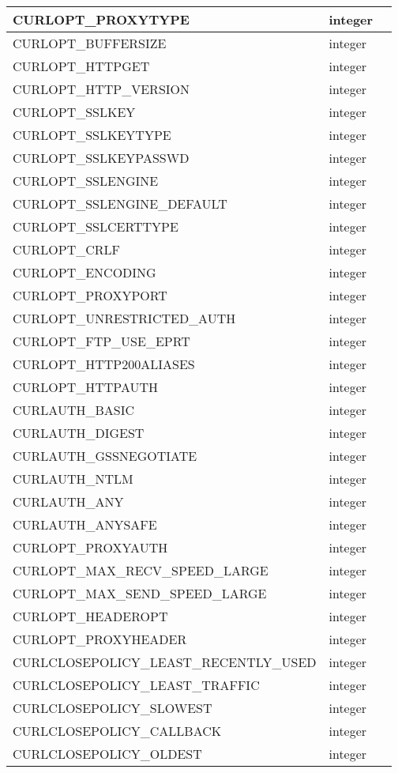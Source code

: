 \begin{longtable}{|m{150pt}|m{40pt}|m{200pt}|}
\hline
CURLOPT\_PROXYTYPE&integer&\\
\hline
CURLOPT\_BUFFERSIZE&integer&\\
\hline
CURLOPT\_HTTPGET&integer&\\
\hline
CURLOPT\_HTTP\_VERSION&integer&\\
\hline
CURLOPT\_SSLKEY&integer&\\
\hline
CURLOPT\_SSLKEYTYPE&integer&\\
\hline
CURLOPT\_SSLKEYPASSWD&integer&\\
\hline
CURLOPT\_SSLENGINE&integer&\\
\hline
CURLOPT\_SSLENGINE\_DEFAULT&integer&\\
\hline
CURLOPT\_SSLCERTTYPE&integer&\\
\hline
CURLOPT\_CRLF&integer&\\
\hline
CURLOPT\_ENCODING&integer&\\
\hline
CURLOPT\_PROXYPORT&integer&\\
\hline
CURLOPT\_UNRESTRICTED\_AUTH&integer&\\
\hline
CURLOPT\_FTP\_USE\_EPRT&integer&\\
\hline
CURLOPT\_HTTP200ALIASES&integer&\\
\hline
CURLOPT\_HTTPAUTH&integer&\\
\hline
CURLAUTH\_BASIC&integer&\\
\hline
CURLAUTH\_DIGEST&integer&\\
\hline
CURLAUTH\_GSSNEGOTIATE&integer&\\
\hline
CURLAUTH\_NTLM&integer&\\
\hline
CURLAUTH\_ANY&integer&\\
\hline
CURLAUTH\_ANYSAFE&integer&\\
\hline
CURLOPT\_PROXYAUTH&integer&\\
\hline
CURLOPT\_MAX\_RECV\_SPEED\_LARGE&integer&\\
\hline
CURLOPT\_MAX\_SEND\_SPEED\_LARGE&integer&\\
\hline
CURLOPT\_HEADEROPT&integer&\\
\hline
CURLOPT\_PROXYHEADER&integer&\\
\hline
CURLCLOSEPOLICY\_LEAST\_RECENTLY\_USED&integer&\\
\hline
CURLCLOSEPOLICY\_LEAST\_TRAFFIC&integer&\\
\hline
CURLCLOSEPOLICY\_SLOWEST&integer&\\
\hline
CURLCLOSEPOLICY\_CALLBACK&integer&\\
\hline
CURLCLOSEPOLICY\_OLDEST&integer&\\

\end{longtable}
